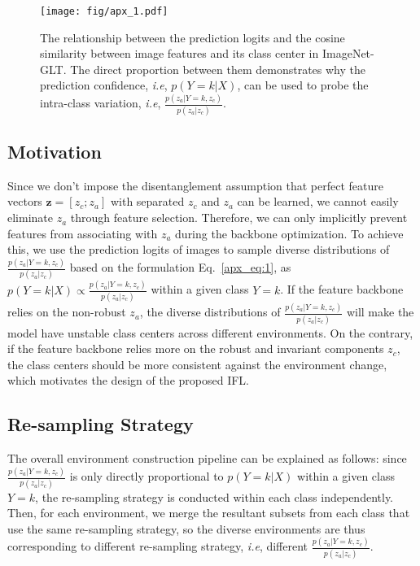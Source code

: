 \documentclass{article}
\def\ie{\emph{i.e}} \def\Ie{\emph{I.e}}
\begin{document}
\begin{figure}[t]
   \begin{minipage}[b]{1.0\linewidth}
   \centerline{\texttt{[image: fig/apx\_1.pdf]}}
   \end{minipage}
   \caption{The relationship between the prediction logits and the cosine similarity between image features and its class center in ImageNet-GLT. The direct proportion between them demonstrates why the prediction confidence, \ie, $p(Y=k|X)$, can be used to probe the intra-class variation, \ie, $\frac{p(z_a|Y=k,z_c)}{p(z_a|z_c)}$.}
   \label{fig:apx1} \end{figure}

\subsection{Motivation}
Since we don't impose the disentanglement assumption that perfect feature vectors $\mathbf{z}=[z_c;z_a]$ with separated $z_c$ and $z_a$ can be learned, we cannot easily eliminate $z_a$ through feature selection. Therefore, we can only implicitly prevent features from associating with $z_a$ during the backbone optimization. To achieve this, we use the prediction logits of images to sample diverse distributions of $\frac{p(z_a|Y=k,z_c)}{p(z_a|z_c)}$ based on the formulation Eq.~\eqref{apx_eq:1}, as $p(Y=k|X) \propto \frac{p(z_a|Y=k,z_c)}{p(z_a|z_c)}$ within a given class $Y=k$. If the feature backbone relies on the non-robust $z_a$, the diverse distributions of $\frac{p(z_a|Y=k,z_c)}{p(z_a|z_c)}$ will make the model have unstable class centers across different environments. On the contrary, if the feature backbone relies more on the robust and invariant components $z_c$, the class centers should be more consistent against the environment change, which motivates the design of the proposed IFL. 

\subsection{Re-sampling Strategy}
The overall environment construction pipeline can be explained as follows: since $\frac{p(z_a|Y=k,z_c)}{p(z_a|z_c)}$ is only directly proportional to $p(Y=k|X)$ within a given class $Y=k$, the re-sampling strategy is conducted within each class independently. Then, for each environment, we merge the resultant subsets from each class that use the same re-sampling strategy, so the diverse environments are thus corresponding to different re-sampling strategy, \ie, different $\frac{p(z_a|Y=k,z_c)}{p(z_a|z_c)}$. 
\end{document}
